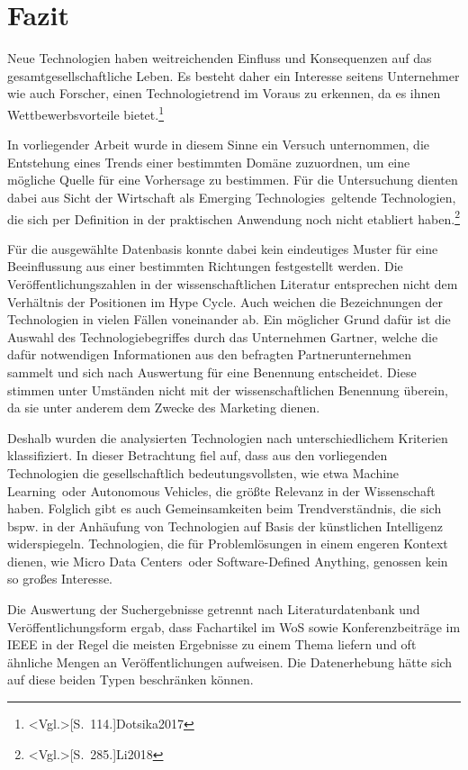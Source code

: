 \section{Fazit}
Neue Technologien haben weitreichenden Einfluss und Konsequenzen auf das ge\-samt\-ge\-sellschaftliche Leben. Es besteht daher ein Interesse seitens Unternehmer wie auch Forscher, einen Technologietrend im Voraus zu erkennen, da es ihnen Wettbewerbsvorteile bietet.\footnote{\citeNP<Vgl.>[S.~114.]{Dotsika2017}}

In vorliegender Arbeit wurde in diesem Sinne ein Versuch unternommen, die Entstehung eines Trends einer bestimmten Domäne zuzuordnen, um eine mögliche Quelle für eine Vorhersage zu bestimmen. Für die Untersuchung dienten dabei aus Sicht der Wirtschaft als \glqq Emerging Technologies\grqq~geltende Technologien, die sich per Definition in der praktischen Anwendung noch nicht etabliert haben.\footnote{\citeNP<Vgl.>[S.~285.]{Li2018}}

Für die ausgewählte Datenbasis konnte dabei kein eindeutiges Muster für eine Beeinflussung aus einer bestimmten Richtungen festgestellt werden. Die Veröffentlichungszahlen in der wissenschaftlichen Literatur entsprechen nicht dem Verhältnis der Positionen im \glqq Hype Cycle\grqq. Auch weichen die Bezeichnungen der Technologien in vielen Fällen voneinander ab. Ein möglicher Grund dafür ist die Auswahl des Technologiebegriffes durch das Unternehmen \glqq Gartner\grqq, welche die dafür notwendigen Informationen aus den befragten Partnerunternehmen sammelt und sich nach Auswertung für eine Benennung entscheidet. Diese stimmen unter Umständen nicht mit der wissenschaftlichen Benennung überein, da sie unter anderem dem Zwecke des Marketing dienen.

Deshalb wurden die analysierten Technologien nach unterschiedlichem Kriterien klassifiziert. In dieser Betrachtung fiel auf, dass aus den vorliegenden Technologien die gesellschaftlich bedeutungsvollsten, wie etwa \glqq Machine Learning\grqq~oder \glqq Autonomous Vehicles\grqq, die größte Relevanz in der Wissenschaft haben. Folglich gibt es auch Gemeinsamkeiten beim Trendverständnis, die sich bspw. in der Anhäufung von Technologien auf Basis der künstlichen Intelligenz widerspiegeln. Technologien, die für Problemlösungen in einem engeren Kontext dienen, wie \glqq Micro Data Centers\grqq~oder \glqq Software-Defined Anything\grqq, genossen kein so großes Interesse. 

Die Auswertung der Suchergebnisse getrennt nach Literaturdatenbank und Veröffentlichungsform ergab, dass Fachartikel im \ac{WoS} sowie Konferenzbeiträge im \ac{IEEE} in der Regel die meisten Ergebnisse zu einem Thema liefern und oft ähnliche Mengen an Veröffentlichungen aufweisen. Die Datenerhebung hätte sich auf diese beiden Typen beschränken können.

